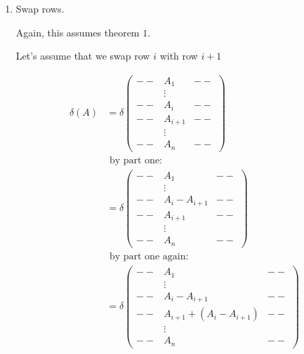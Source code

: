{\begin{enumerate}[label=(Type: \roman*):, wide]
		      But, the first matrix's determinant is \(0\) since it has two identical rows.

		      Thus, \(\delta(E \cdot A) = a \cdot 0 + \delta(A) = \delta(A)\).
		\item Swap rows.

		      Again, this assumes theorem \(1\).

		      Let's assume that we swap row \(i\) with row \(i + 1\)

		      {\allowdisplaybreaks
				      \begin{align*}
					      \delta(A) & = \delta \begin{pmatrix} -- & A_1 & -- \\ & \vdots &  \\ -- & A_i & -- \\ -- & A_{i+1} & -- \\  & \vdots &  \\ -- & A_n & -- \end{pmatrix}                                                                                                                                              \\
					                & \text{ by part one:}                                                                                                                                                                                                                                                                    \\
					                & = \delta \begin{pmatrix} -- & A_1 & -- \\ & \vdots &  \\ -- & A_{i} - A_{i+1} & -- \\ -- & A_{i+1} & -- \\  & \vdots &  \\ -- & A_n & -- \end{pmatrix}                                                                                                                                  \\
					                & \text{ by part one again:}                                                                                                                                                                                                                                                              \\
					                & = \delta \begin{pmatrix} -- & A_1 & -- \\ & \vdots &  \\ -- & A_{i} - A_{i+1} & -- \\ -- & A_{i + 1} + \left(A_{i} - A_{i+1}\right) & -- \\  & \vdots &  \\ -- & A_n & -- \end{pmatrix}                                                                                                 \\

\end{align*}}
\end{enumerate}}

